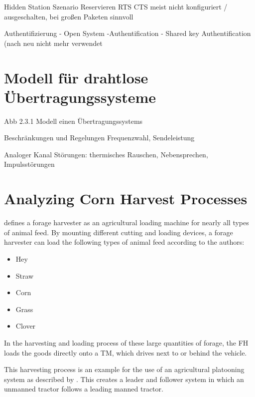\documentclass[]{nsm-thesis}
\begin{document}
Hidden Station Szenario
Reservieren
RTS CTS
meist nicht konfiguriert / ausgeschalten, bei großen Paketen sinnvoll



Authentifizierung
- Open System -Authentification
- Shared key Authentification
(nach neu nicht mehr verwendet





\section{Modell für drahtlose Übertragungssysteme}

Abb 2.3.1  Modell einen Übertragungssystems

Beschränkungen und Regelungen Frequenzwahl, Sendeleistung

Analoger Kanal Störungen: thermisches Rauschen, Nebensprechen, Impulsstörungen



\section{Analyzing Corn Harvest Processes}

\textcite{seifert_feldhacksler_1962} defines a forage harvester as an agricultural loading machine for nearly all types of animal feed. By mounting different cutting and loading devices, a forage harvester can load the following types of animal feed according to the authors:
\begin{itemize}
	\item Hey
	\item Straw
	\item Corn
	\item Grass
		\item Clover 
\end{itemize}

\textcite{Faustzahlen_Landwirtschaft}

In the harvesting and loading process of these large quantities of forage, the \ac{FH} loads the goods directly onto a \ac{TM}, which drives next to or behind the vehicle.

This harvesting process is an example for the use of an agricultural platooning system as described by 
\textcite{zhang_method_2009}. This creates a leader and follower system in which an unmanned tractor follows a leading manned tractor.
\end{document}
